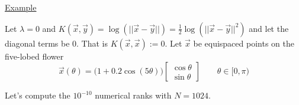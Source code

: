 \begin{center}
\end{center}

\underline{Example}

Let $\lambda=0$ and $K(\vec{x}, \vec{y})=\log(||\vec{x} - \vec{y}||)=\frac{1}{2}\log(||\vec{x} - \vec{y}||^2)$
and let the diagonal terms be 0. That is $K(\vec{x}, \vec{x}):= 0$. Let $\vec{x}$ be equispaced points on the five-lobed flower
\begin{equation*}
    \vec{x}(\theta) = \big(1 + 0.2 \cos (5 \theta)\big)
    \begin{bmatrix}
        \cos \theta \\
        \sin \theta
    \end{bmatrix}
    \qquad \theta \in [0, \pi)
\end{equation*}

Let's compute the $10^{-10}$ numerical ranks with $N=1024$.



